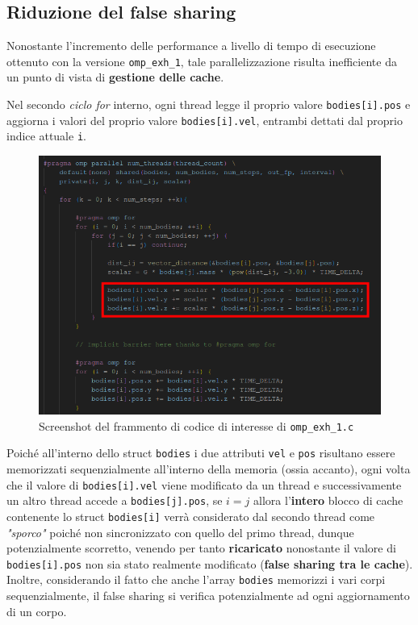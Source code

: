 \documentclass[12pt]{report}
\begin{document}
    \newpage

    \subsection{Riduzione del false sharing}

    Nonostante l'incremento delle performance a livello di tempo di esecuzione ottenuto con la versione \texttt{omp\_exh\_1}, tale parallelizzazione risulta inefficiente da un punto di vista di \textbf{gestione delle cache}.
    
    Nel secondo \textit{ciclo for} interno, ogni thread legge il proprio valore \texttt{bodies[i].pos} e aggiorna i valori del proprio valore \texttt{bodies[i].vel}, entrambi dettati dal proprio indice attuale \texttt{i}.

    \begin{figure}[H]
        \centering
        \includegraphics[width=\textwidth]{images/omp_exh_1_false_sharing.png}
        \caption{Screenshot del frammento di codice di interesse di \texttt{omp\_exh\_1.c}}
        \label{fig:omp_exh_1_false_sharing}
    \end{figure}

    Poiché all'interno dello struct \texttt{bodies} i due attributi \texttt{vel} e \texttt{pos} risultano essere memorizzati sequenzialmente all'interno della memoria (ossia accanto), ogni volta che il valore di \texttt{bodies[i].vel} viene modificato da un thread e successivamente un altro thread accede a \texttt{bodies[j].pos}, se $i = j$ allora l'\textbf{intero} blocco di cache contenente lo struct \texttt{bodies[i]} verrà considerato dal secondo thread come \textit{"sporco"} poiché non sincronizzato con quello del primo thread, dunque potenzialmente scorretto, venendo per tanto \textbf{ricaricato} nonostante il valore di \texttt{bodies[i].pos} non sia stato realmente modificato (\textbf{false sharing tra le cache}). Inoltre, considerando il fatto che anche l'array \texttt{bodies} memorizzi i vari corpi sequenzialmente, il false sharing si verifica potenzialmente ad ogni aggiornamento di un corpo.
    
\end{document}
